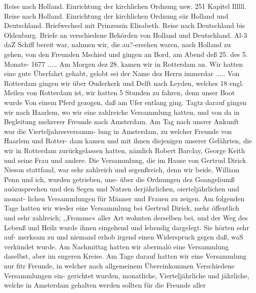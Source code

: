 Reise nach Holland. Einrichtung der kirchlichen Ordnung usw. 251
Kapitel Illlll.
Reise nach Holland. Einrichtung der kirchlichen Ordnung sür
Holland und Deutschland. Briefwechsel mit Prinzessin Elisabeth.
Reise nach Deutschland bis Oldenburg. Briefe an verschiedene
Behörden von Holland und Deutschland.
Al-3 daZ Schiff bereit war, nahmen wir, die au?-ersehen waren,
nach Holland zu gehen, von den Freunden Mschied und gingen
an Bord, am Abend deß 25. des 5. Monate- 1677 .....
Am Morgen dez 28. kamen wir in Rotterdam an. Wir
hatten eine gute Überfahrt gehabt, gelobt sei der Name dez Herrn
immerdar .....
Von Rotterdam gingen wir über Ouderkerk und Delft nach
Leyden, welches 18 engl. Meilen von Rotterdam ist, wir hatten
5 Stunden zu fahren, denn unser Boot wurde Von einem Pferd
gezogen, daß am Ufer entlang ging. Tagtz darauf gingen wir
nach Haarlem, wo wir eine zahlreiche Versammlung hatten, und
von da in Begleitung mehrerer Freunde nach Amsterdam.
Am Tag nach unsrer Ankunft war die Vierteljahresversamm-
lung in Amsterdam, zu welcher Freunde von Haarlem und Rotter-
dam kamen und mit ihnen diejenigen unserer Gefährten, die wir
in Rotterdam zurückgelassen hatten, nämlich Robert Barclay,
George Keith und seine Frau und andere. Die Versammlung, die
im Hause von Gertrud Dirick Nieson stattfand, war sehr zahlreich
und segenßreich, denn wir beide, William Penn und ich, wurden
getrieben, une- über die Ordnungen dez Goangeliumß auözusprechen
und den Segen und Nutzen derjährlichen, oierteljährlichen und monat-
lichen Versammlungen für Männer und Frauen zu zeigen. Am
folgenden Tage hatten wir wieder eine Versammlung bei Gertrud
Diriek, mehr öffentlich und sehr zahlreich; ,,Fromme« aller Art
wohnten derselben bei, und der Weg des Lebenß und Heilz wurde
ihnen eingehend und lebendig dargelegt. Sie hörten sehr auf-
merksam zu und niemand erhob irgend einen Widerspruch gegen
daß, waS verkündet wurde. Am Nachmittag hatten wir abermalö
eine Versammlung daselbst, aber im engeren Kreise. Am Tage
darauf hatten wir eine Versammlung nur fitr Freunde, in welcher
nach allgemeinem Übereinkommen Verschiedene Versammlungen ein-
gerichtet wurden, monatliche, Vierteljährliche und jährliche, welche
in Amsterdam gehalten werden sollten für die Freunde aller


